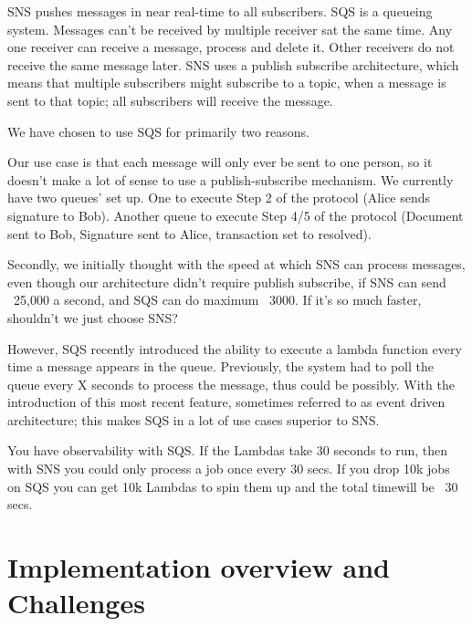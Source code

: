 \documentclass[runningheads]{llncs}
\begin{document}
SNS pushes messages in near real-time to all subscribers. SQS is a queueing system. Messages can't be received by multiple receiver sat the same time. Any one receiver can receive a message, process and delete it. Other receivers do not receive the same message later. SNS uses a publish subscribe architecture, which means that multiple subscribers might subscribe to a topic, when a message is sent to that topic; all subscribers will receive the message.

We have chosen to use SQS for primarily two reasons.

Our use case is that each message will only ever be sent to one person, so it doesn't make a lot of sense to use a publish-subscribe mechanism. We currently have two queues' set up. One to execute Step 2 of the protocol (Alice sends signature to Bob). Another queue to execute Step 4/5 of the protocol (Document sent to Bob, Signature sent to Alice, transaction set to resolved).

Secondly, we initially thought with the speed at which SNS can process messages, even though our architecture didn't require publish subscribe, if SNS can send ~25,000 a second, and SQS can do maximum ~3000. If it's so much faster, shouldn't we just choose SNS?

However, SQS recently introduced the ability to execute a lambda function every time a message appears in the queue. Previously, the system had to poll the queue every X seconds to process the message, thus could be possibly. With the introduction of this most recent feature, sometimes referred to as event driven architecture; this makes SQS in a lot of use cases superior to SNS.

You have observability with SQS.  If the Lambdas take 30 seconds to run, then with SNS you could only process a job once every 30 secs.  If you drop 10k jobs on SQS you can get 10k Lambdas to spin them up and the total timewill be ~30 secs.
\section{Implementation overview and Challenges}
\end{document}
